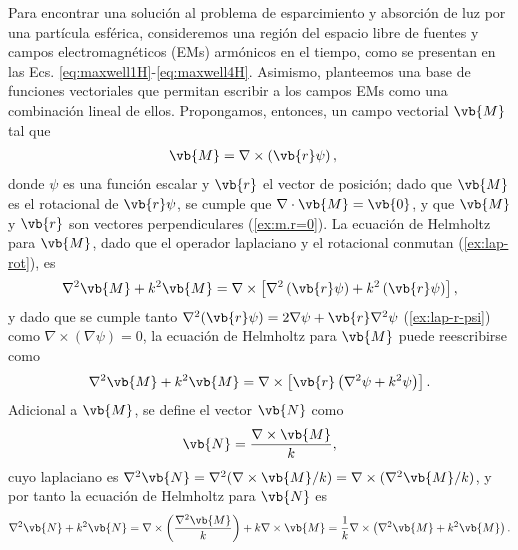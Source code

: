 
Para encontrar una solución al problema de esparcimiento y absorción de luz por una partícula esférica, consideremos una región del espacio libre de fuentes y campos electromagnéticos (EMs) armónicos en el tiempo, como se presentan en las Ecs. \eqref{eq:maxwell1H}-\eqref{eq:maxwell4H}. Asimismo, planteemos una base de funciones vectoriales que permitan escribir a los campos EMs como una combinación lineal de ellos. Propongamos, entonces, un campo vectorial $\vb{M}$ tal que \cite{bohren1998absorption}
%
	\begin{align}
	\vb{M} &= \nabla \times \left(\vb{r} \psi\right),
	\label{eq:MrotCPsi}
	\end{align}
%
donde $\psi$ es una función escalar y $\vb{r}$ el vector de posición; dado que $\vb{M}$ es el rotacional de  $\vb{r}\psi$, se cumple que $\nabla\cdot \vb{M} = \vb{0}$, y que $\vb{M}$ y $\vb{r}$ son vectores perpendiculares (\ref{ex:m.r=0}). La  ecuación de Helmholtz para $\vb{M}$, dado que el operador laplaciano y el rotacional conmutan (\ref{ex:lap-rot}), es
	\begin{align*}
	\nabla^2 \vb{M} + k^2 \vb{M} = \nabla\times \left[ \nabla^2\left(\vb{r} \psi\right)  
											+ k^2  \left(\vb{r} \psi\right) \right],
	\end{align*}
y dado que se cumple tanto  $\nabla^2 (\vb{r}\psi)=2\nabla\psi+\vb{r}\nabla^2\psi$ (\ref{ex:lap-r-psi})  como $\nabla\times(\nabla \psi)=0$, la ecuación de Helmholtz para $\vb{M}$ puede reescribirse como
	\begin{align}
	\nabla^2 \vb{M} + k^2\vb{M}  = \nabla\times\left[\vb{r}\left( \nabla^2\psi+k^2\psi \right) \right].
	\label{eq:Helm-M}
	\end{align}
Adicional a $\vb{M}$, se define el vector $\vb{N}$ como \cite{bohren1998absorption} 
	\begin{align}
	\vb{N} = \frac{\nabla\times \vb{M}}{k}, \label{eq:NrotM/k}
	\end{align}
cuyo laplaciano es $\nabla^2 \vb{N} = \nabla^2( \nabla\times \vb{M} /k) =  \nabla\times (\nabla^2\vb{M} /k) $, y por tanto la ecuación de Helmholtz para $\vb{N}$ es
%	
	\begin{align}
	\nabla^2 \vb{N} + k^2 \vb{N} =  \nabla\times \left( \frac{\nabla^2 \vb{M}}{k} \right) + k \nabla\times \vb{M} 
		 = \frac{1}{k} \nabla\times \left( \nabla^2 \vb{M} + k^2  \vb{M} \right).
	\label{eq:Helm-N}
	\end{align}
%

